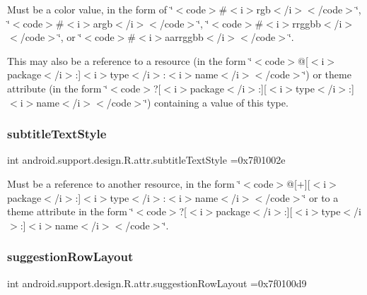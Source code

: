 Must be a color value, in the form of \char`\"{}$<$code$>$\#$<$i$>$rgb$<$/i$>$$<$/code$>$\char`\"{}, \char`\"{}$<$code$>$\#$<$i$>$argb$<$/i$>$$<$/code$>$\char`\"{}, \char`\"{}$<$code$>$\#$<$i$>$rrggbb$<$/i$>$$<$/code$>$\char`\"{}, or \char`\"{}$<$code$>$\#$<$i$>$aarrggbb$<$/i$>$$<$/code$>$\char`\"{}. 

This may also be a reference to a resource (in the form \char`\"{}$<$code$>$@\mbox{[}$<$i$>$package$<$/i$>$\+:\mbox{]}$<$i$>$type$<$/i$>$\+:$<$i$>$name$<$/i$>$$<$/code$>$\char`\"{}) or theme attribute (in the form \char`\"{}$<$code$>$?\mbox{[}$<$i$>$package$<$/i$>$\+:\mbox{]}\mbox{[}$<$i$>$type$<$/i$>$\+:\mbox{]}$<$i$>$name$<$/i$>$$<$/code$>$\char`\"{}) containing a value of this type. \mbox{\label{classandroid_1_1support_1_1design_1_1R_1_1attr_a2d8877abb4f0cd5569d1e413558667b7}} 
\subsubsection{\texorpdfstring{subtitle\+Text\+Style}{subtitleTextStyle}}
{\footnotesize\ttfamily int android.\+support.\+design.\+R.\+attr.\+subtitle\+Text\+Style =0x7f01002e\hspace{0.3cm}{\ttfamily [static]}}

Must be a reference to another resource, in the form \char`\"{}$<$code$>$@\mbox{[}+\mbox{]}\mbox{[}$<$i$>$package$<$/i$>$\+:\mbox{]}$<$i$>$type$<$/i$>$\+:$<$i$>$name$<$/i$>$$<$/code$>$\char`\"{} or to a theme attribute in the form \char`\"{}$<$code$>$?\mbox{[}$<$i$>$package$<$/i$>$\+:\mbox{]}\mbox{[}$<$i$>$type$<$/i$>$\+:\mbox{]}$<$i$>$name$<$/i$>$$<$/code$>$\char`\"{}. \mbox{\label{classandroid_1_1support_1_1design_1_1R_1_1attr_ad909aebf0409cf0d4e1a58e44ddf7248}} 
\subsubsection{\texorpdfstring{suggestion\+Row\+Layout}{suggestionRowLayout}}
{\footnotesize\ttfamily int android.\+support.\+design.\+R.\+attr.\+suggestion\+Row\+Layout =0x7f0100d9\hspace{0.3cm}{\ttfamily [static]}}


